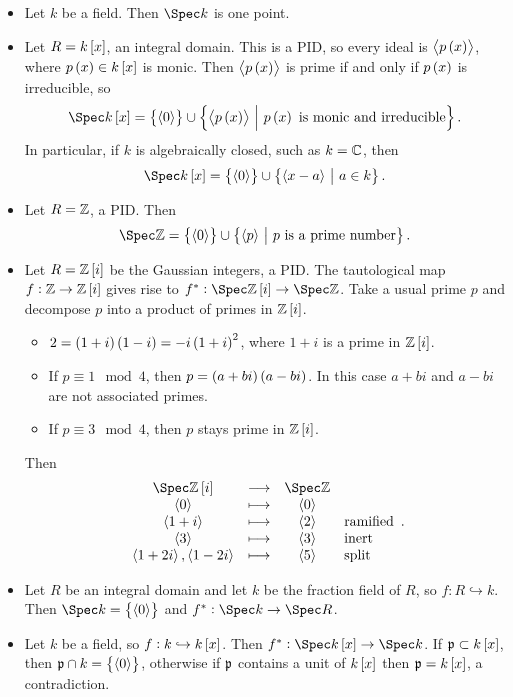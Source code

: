 \begin{example*}
\hfill
\begin{itemize}
\item Let $ k $ be a field. Then $ \Spec k $ is one point.
\item Let $ R = k\sbr{x} $, an integral domain. This is a PID, so every ideal is $ \abr{p\br{x}} $, where $ p\br{x} \in k\sbr{x} $ is monic. Then $ \abr{p\br{x}} $ is prime if and only if $ p\br{x} $ is irreducible, so
$$ \Spec k\sbr{x} = \cbr{\abr{0}} \cup \cbr{\abr{p\br{x}} \st p\br{x} \ \text{is monic and irreducible}}. $$
In particular, if $ k $ is algebraically closed, such as $ k = \mathbb{C} $, then
$$ \Spec k\sbr{x} = \cbr{\abr{0}} \cup \cbr{\abr{x - a} \st a \in k}. $$
\item Let $ R = \mathbb{Z} $, a PID. Then
$$ \Spec \ZZ = \cbr{\abr{0}} \cup \cbr{\abr{p} \st p \ \text{is a prime number}}. $$
\item Let $ R = \ZZ\sbr{i} $ be the Gaussian integers, a PID. The tautological map $ f : \ZZ \to \ZZ\sbr{i} $ gives rise to $ f^* : \Spec \ZZ\sbr{i} \to \Spec \ZZ $. Take a usual prime $ p $ and decompose $ p $ into a product of primes in $ \ZZ\sbr{i} $.
\begin{itemize}
\item $ 2 = \br{1 + i}\br{1 - i} = -i\br{1 + i}^2 $, where $ 1 + i $ is a prime in $ \ZZ\sbr{i} $.
\item If $ p \equiv 1 \mod 4 $, then $ p = \br{a + bi}\br{a - bi} $. In this case $ a + bi $ and $ a - bi $ are not associated primes.
\item If $ p \equiv 3 \mod 4 $, then $ p $ stays prime in $ \ZZ\sbr{i} $.
\end{itemize}
Then
$$
\begin{array}{cccl}
\Spec \ZZ\sbr{i} & \longrightarrow & \Spec \ZZ & \\
\abr{0} & \longmapsto & \abr{0} & \\
\abr{1 + i} & \longmapsto & \abr{2} & \text{ramified} \\
\abr{3} & \longmapsto & \abr{3} & \text{inert} \\
\abr{1 + 2i}, \abr{1 - 2i} & \longmapsto & \abr{5} & \text{split}
\end{array}.
$$
\item Let $ R $ be an integral domain and let $ k $ be the fraction field of $ R $, so $ f : R \hookrightarrow k $. Then $ \Spec k = \cbr{\abr{0}} $ and $ f^* : \Spec k \to \Spec R $.
\item Let $ k $ be a field, so $ f : k \hookrightarrow k\sbr{x} $. Then $ f^* : \Spec k\sbr{x} \to \Spec k $. If $ \ppp \subset k\sbr{x} $, then $ \ppp \cap k = \cbr{\abr{0}} $, otherwise if $ \mathfrak{p} $ contains a unit of $ k\sbr{x} $ then $ \ppp = k\sbr{x} $, a contradiction.
\end{itemize}
\end{example*}

